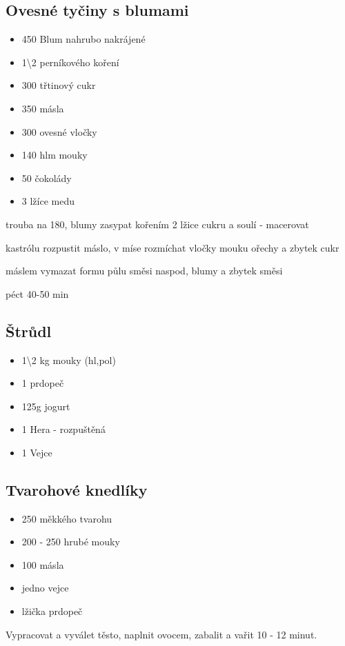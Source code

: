 \documentclass[10pt,a4paper]{article}
\newenvironment{myitemize}
{ \begin{itemize}
    \setlength{\itemsep}{0pt}
    \setlength{\parskip}{0pt}
    \setlength{\parsep}{0pt}     }
{ \end{itemize}                  }
\begin{document}
\subsection{Ovesné tyčiny s blumami}
\begin{minipage}[t]{0,5\textwidth}
\begin{myitemize} 
\item 450 Blum nahrubo nakrájené
\item 1\textbackslash 2 perníkového koření
\item300 třtinový cukr
\item350 másla
\item300 ovesné vločky
\item140 hlm mouky
\item50 čokolády
\item3 lžíce medu
\end{myitemize}
\end{minipage}
\begin{minipage}[t]{0,5\textwidth}
trouba na 180, blumy zasypat kořením 2 lžice cukru a soulí - macerovat

kastrólu rozpustit máslo, v míse rozmíchat vločky mouku ořechy a zbytek cukr

máslem vymazat formu půlu směsi naspod, blumy a zbytek směsi

péct 40-50 min
\end{minipage}
\subsection{Štrůdl}
\begin{minipage}[t]{0,5\textwidth}
\begin{myitemize} 
\item 1\textbackslash 2 kg mouky (hl,pol)
\item 1 prdopeč
\item 125g jogurt
\item 1 Hera - rozpuštěná
\item 1 Vejce
\end{myitemize}
\end{minipage}
\begin{minipage}[t]{0,5\textwidth}

\end{minipage}

\subsection{Tvarohové knedlíky}
\begin{minipage}[t]{0,5\textwidth}
\begin{myitemize} 
\item 250 měkkého tvarohu
\item 200 - 250 hrubé mouky
\item 100 másla
\item jedno vejce
\item lžička prdopeč
\end{myitemize}
\end{minipage}
\begin{minipage}[t]{0,5\textwidth}
Vypracovat a vyválet těsto, naplnit ovocem, zabalit a vařit 10 - 12 minut.
\end{minipage}
\end{document}
